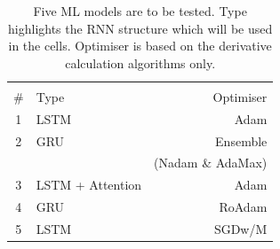 \begin{table}[h]
    \renewcommand{\arraystretch}{1.3}
    \caption{
        Five ML models are to be tested.
        Type highlights the RNN structure which will be used in the cells.
        Optimiser is based on the derivative calculation algorithms only.
        }
        \centering
        \label{tab:experiment}
    \begin{tabular}{c l r}
        \hline\hline \\[-4mm]
        \# & Type                 & Optimiser  \\
        \hline
        1  & LSTM                 & Adam   \\
        2  & GRU                  &  Ensemble \\
           &                      & (Nadam \& AdaMax) \\
        3  & LSTM + Attention     & Adam \\
        4  & GRU                  & RoAdam \\
        5  & LSTM                 & SGDw/M \\
        \hline\hline
    \end{tabular}
\end{table}

%
